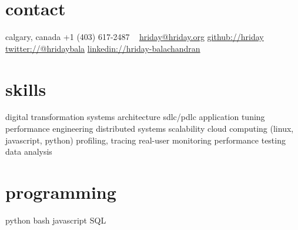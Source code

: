 \begin{aside}
    \section{contact}
        calgary, canada
        +1 (403) 617-2487
        ~
        \href{mailto:hriday@hriday.org}{hriday@hriday.org}
        \href{https://github.com/hriday}{github://hriday}
        \href{https://twitter.com/hridaybala}{twitter://@hridaybala}
        \href{https://www.linkedin.com/in/hriday-balachandran}{linkedin://hriday-balachandran}
    \section{skills}
        digital transformation
	systems architecture
        sdlc/pdlc
	application tuning
        performance engineering
        distributed systems
        scalability
        cloud computing
        (linux, javascript, python)
        profiling, tracing
        real-user monitoring
        performance testing
        data analysis
        \section{programming}
        python
        bash
	javascript
	SQL
\end{aside}
